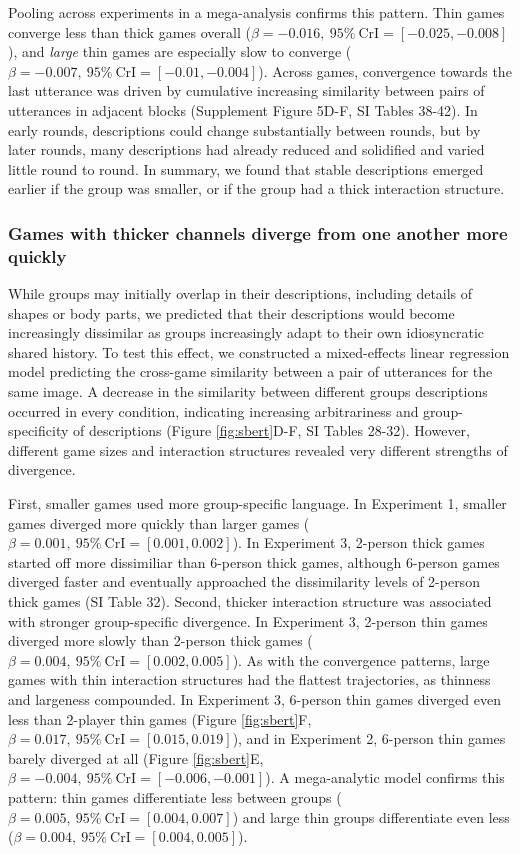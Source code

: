 \documentclass[
  english,
]{article}
\begin{document}
Pooling across experiments in a mega-analysis confirms this pattern.
Thin games converge less than thick games overall (\(\beta=-0.016,\:95\%\:\mathrm{CrI}=[-0.025, -0.008]\)), and \emph{large} thin games are especially slow to converge (\(\beta=-0.007,\:95\%\:\mathrm{CrI}=[-0.01, -0.004]\)).
Across games, convergence towards the last utterance was driven by cumulative increasing similarity between pairs of utterances in adjacent blocks (Supplement Figure 5D-F, SI Tables 38-42).
In early rounds, descriptions could change substantially between rounds, but by later rounds, many descriptions had already reduced and solidified and varied little round to round.
In summary, we found that stable descriptions emerged earlier if the group was smaller, or if the group had a thick interaction structure.

\subsubsection{Games with thicker channels diverge from one another more quickly}\label{games-with-thicker-channels-diverge-from-one-another-more-quickly}

While groups may initially overlap in their descriptions, including details of shapes or body parts, we predicted that their descriptions would become increasingly dissimilar as groups increasingly adapt to their own idiosyncratic shared history.
To test this effect, we constructed a mixed-effects linear regression model predicting the cross-game similarity between a pair of utterances for the same image.
A decrease in the similarity between different groups descriptions occurred in every condition, indicating increasing arbitrariness and group-specificity of descriptions (Figure \ref{fig:sbert}D-F, SI Tables 28-32).
However, different game sizes and interaction structures revealed very different strengths of divergence.

First, smaller games used more group-specific language.
In Experiment 1, smaller games diverged more quickly than larger games (\(\beta=0.001,\:95\%\:\mathrm{CrI}=[0.001, 0.002]\)).
In Experiment 3, 2-person thick games started off more dissimiliar than 6-person thick games, although 6-person games diverged faster and eventually approached the dissimilarity levels of 2-person thick games (SI Table 32).
Second, thicker interaction structure was associated with stronger group-specific divergence.
In Experiment 3, 2-person thin games diverged more slowly than 2-person thick games (\(\beta=0.004,\:95\%\:\mathrm{CrI}=[0.002, 0.005]\)).
As with the convergence patterns, large games with thin interaction structures had the flattest trajectories, as thinness and largeness compounded.
In Experiment 3, 6-person thin games diverged even less than 2-player thin games (Figure \ref{fig:sbert}F, \(\beta=0.017,\:95\%\:\mathrm{CrI}=[0.015, 0.019]\)), and in Experiment 2, 6-person thin games barely diverged at all (Figure \ref{fig:sbert}E, \(\beta=-0.004,\:95\%\:\mathrm{CrI}=[-0.006, -0.001]\)).
A mega-analytic model confirms this pattern: thin games differentiate less between groups (\(\beta=0.005,\:95\%\:\mathrm{CrI}=[0.004, 0.007]\)) and large thin groups differentiate even less (\(\beta=0.004,\:95\%\:\mathrm{CrI}=[0.004, 0.005]\)).
\end{document}
